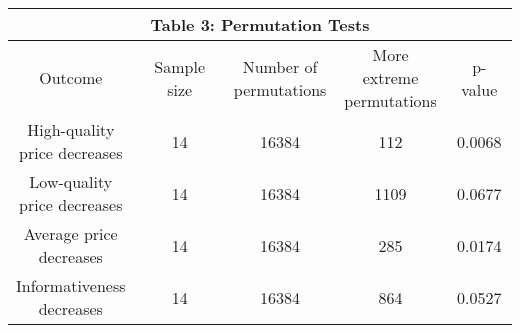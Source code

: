 
\begin{table}[htbp]
\renewcommand{\arraystretch}{2.5}
\begin{tabular}{ccccc}
\multicolumn{5}{c}{\textbf{Table 3: Permutation Tests}} \\
\toprule
Outcome & Sample size & \shortstack{Number of\\permutations} & \shortstack{More extreme\\permutations} & p-value \\
\cmidrule(lr){1-1} \cmidrule(lr){2-2} \cmidrule(lr){3-3} \cmidrule(lr){4-4} \cmidrule(lr){5-5} 
\shortstack{High-quality\\price decreases} & 14 & 16384 & 112 & 0.0068 \\
\shortstack{Low-quality\\price decreases} & 14 & 16384 & 1109 & 0.0677 \\
\shortstack{Average price\\decreases} & 14 & 16384 & 285 & 0.0174 \\
\shortstack{Informativeness\\decreases} & 14 & 16384 & 864 & 0.0527 \\

\bottomrule
\end{tabular}
    
    
\end{table}
